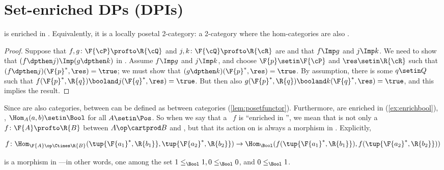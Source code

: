 
\section{Set-enriched DPs (DPIs)}

\begin{proposition}
    \label{prop:DP_loc_pos}
    \DP is enriched in \Pos.
    Equivalently, it is a locally posetal 2-category: a 2-category where the hom-categories are also .
\end{proposition}
\begin{proof}
    Suppose that $f,g\colon \F{\cP} \profto \R{\cQ}$ and $j,k\colon \F{\cQ} \profto \R{\cR}$ are  and that $f\Imp g$ and $j\Imp k$.
    We need to show that $(f\dpthen j)\Imp(g\dpthen k)$ in \DP.
    Assume $f\Imp g$ and $j\Imp k$, and choose $\F{p}\setin\F{\cP} $ and $\res\setin\R{\cR}$ such that $(f\dpthen j)(\F{p}^*,\res)=\true$; we must show that $(g \dpthen k)(\F{p}^*,\res)=\true$.
    By assumption, there is some $q\setin Q$ such that $f(\F{p}^*,\R{q})\booland j(\F{q}^*,\res)=\true$.
    But then also $g(\F{p}^*,\R{q})\booland k(\F{q}^*,\res)=\true$, and this implies the result.
\end{proof}
Since  are also categories,  between  can be defined as  between  categories (\cref{lem:posetfunctor}).
Furthermore,  are enriched in \Bool (\cref{ex:enrichbool}), \ie, $\Hom_A(a,b) \setin \Bool$ for all $A \setin \Pos$.
So when we say that a ~$f$ is ``enriched in \Bool'', we mean that is not only a  $f \colon \F{A} \profto \R{B}$ between  $A\op \cartprod B$ and \Bool, but that its action on  is always a morphism in \Bool.
Explicitly,

\begin{widepar}
    \begin{equation}
        f \colon \Hom_{\F{A}\op \Ctimes \R{B}}(\tup{\F{a_1}^*,\R{b_1}}, \tup{\F{a_2}^*,\R{b_2}}) \to \Hom_\Bool(f(\tup{\F{a_1}^*,\R{b_1}}), f(\tup{\F{a_2}^*,\R{b_2}}))
    \end{equation}
\end{widepar}
is a morphism in \Bool---in other words, one among the set $1 \leq_\Bool 1, 0 \leq_\Bool 0$, and $0 \leq_\Bool 1$.


